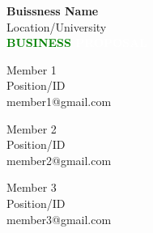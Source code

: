 \documentclass[11pt]{article}
\begin{document}
\begin{titlepage}
    \vspace*{\fill} %
    \begin{center}
        \textbf{\huge {Buissness Name}} \\ %
        \vspace{0.5cm}
        \large Location/University \\
        \vspace{2cm}
        \textbf{\Huge \textcolor{green}{BUSINESS} \textcolor{white}{PROPOSAL}} \\
        \vspace{2cm}
        \begin{minipage}[t]{0.3\textwidth}
            \begin{flushleft}
                Member 1 \\
                Position/ID \\
                member1@gmail.com
            \end{flushleft}
        \end{minipage}
        \begin{minipage}[t]{0.3\textwidth}
            \begin{center}
                Member 2 \\
                Position/ID \\
                member2@gmail.com
            \end{center}
        \end{minipage}
        \begin{minipage}[t]{0.3\textwidth}
            \begin{flushright}
                Member 3 \\
                Position/ID \\
                member3@gmail.com
            \end{flushright}
        \end{minipage}
        
        \vspace{1cm} %
        

\end{center}
\end{titlepage}
\end{document}
